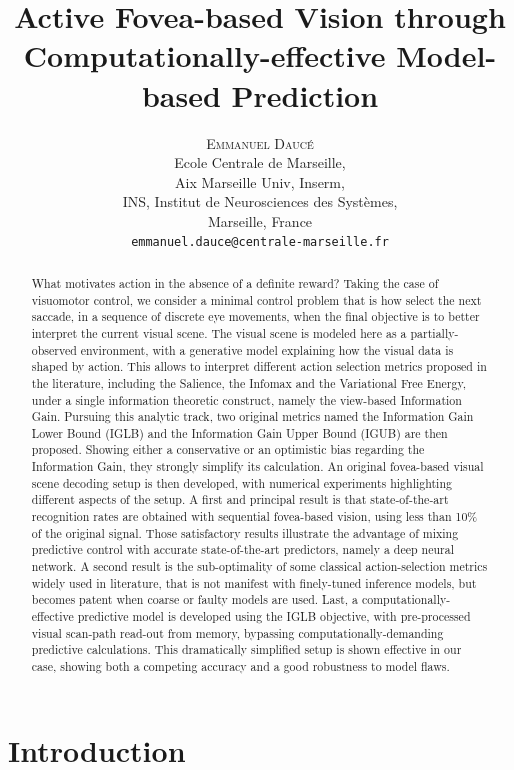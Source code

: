 \documentclass[12pt,twoside,openright]{article}
\title{\textbf{Active Fovea-based Vision through Computationally-effective Model-based Prediction}}
\author{\textsc{Emmanuel Daucé}\\
	Ecole Centrale de Marseille,\\ 
	Aix Marseille Univ, Inserm,\\ 
	INS, Institut de Neurosciences des Systèmes, \\
	Marseille, France\\
	\texttt{emmanuel.dauce@centrale-marseille.fr} 
}%
\date{}
\begin{document}
	
\maketitle
	
\begin{abstract}
{\color{Purple} What motivates action in the absence of a definite reward? Taking the case of visuomotor control, we consider a minimal control problem that is how select the next saccade, in a sequence of discrete eye movements, when the final objective is to better interpret the current visual scene.
The visual scene is modeled here as a partially-observed environment,
with a generative model explaining how the visual data is shaped by action.
This allows to interpret different action selection metrics proposed in the literature, 
including the Salience, the Infomax and the Variational Free Energy, under a single information theoretic construct, namely the view-based Information Gain.
Pursuing this analytic track, two original metrics named the Information Gain Lower Bound (IGLB) and the Information Gain Upper Bound (IGUB) are then proposed. Showing either a conservative or an optimistic bias regarding the Information Gain, they strongly simplify its calculation.
An original fovea-based visual scene decoding setup is then developed, }
with numerical experiments highlighting different aspects of the setup. 
A first and principal result is that state-of-the-art recognition rates are obtained with sequential fovea-based vision, using less than 10\% of the original signal. Those satisfactory results illustrate the advantage of mixing predictive control with accurate state-of-the-art predictors, namely a deep neural network. 
A second result is the sub-optimality of some classical action-selection metrics widely used in literature, that is not manifest with finely-tuned {\color{Purple} inference} models, but becomes patent when coarse or faulty models are used.
Last, a computationally-effective predictive model is developed using the {\color{Purple}IGLB} objective, with pre-processed visual scan-path read-out from memory, bypassing computationally-demanding predictive calculations.    
This dramatically simplified setup is shown effective in our case, showing both a competing accuracy and a good robustness to model flaws. 



\end{abstract}
\section{Introduction}
\end{document}

